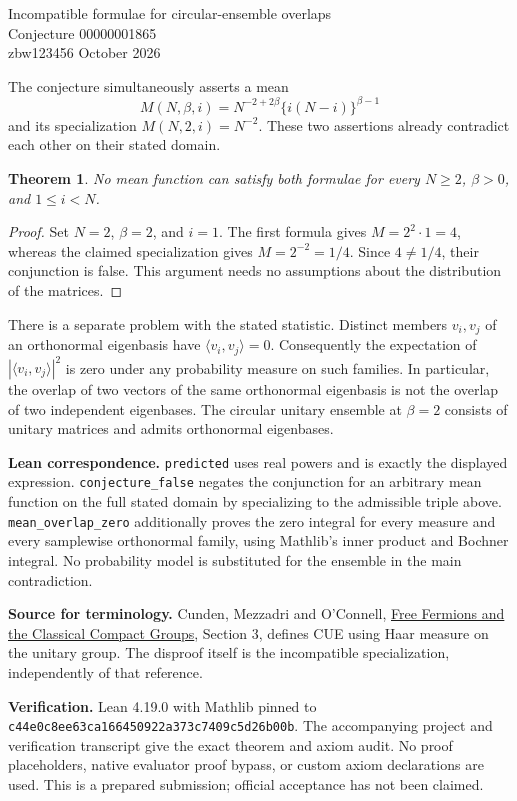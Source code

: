 \documentclass[11pt]{article}
\newtheorem{theorem}{Theorem}
\begin{document}
\begin{center}{\Large Incompatible formulae for circular-ensemble overlaps}\\[5pt]{\large Conjecture 00000001865}\\[5pt]zbw123456  October 2026\end{center}

The conjecture simultaneously asserts a mean
\[
 M(N,\beta,i)=N^{-2+2\beta}\{i(N-i)\}^{\beta-1}
\]
and its specialization $M(N,2,i)=N^{-2}$. These two assertions already contradict each other on their stated domain.
\begin{theorem}
No mean function can satisfy both formulae for every $N\ge2$, $\beta>0$, and $1\le i<N$.
\end{theorem}
\begin{proof}
Set $N=2$, $\beta=2$, and $i=1$. The first formula gives $M=2^2\cdot1=4$, whereas the claimed specialization gives $M=2^{-2}=1/4$. Since $4\ne1/4$, their conjunction is false. This argument needs no assumptions about the distribution of the matrices.
\end{proof}
There is a separate problem with the stated statistic. Distinct members $v_i,v_j$ of an orthonormal eigenbasis have $\langle v_i,v_j\rangle=0$. Consequently the expectation of $|\langle v_i,v_j\rangle|^2$ is zero under any probability measure on such families. In particular, the overlap of two vectors of the same orthonormal eigenbasis is not the overlap of two independent eigenbases. The circular unitary ensemble at $\beta=2$ consists of unitary matrices and admits orthonormal eigenbases.

\textbf{Lean correspondence.} \texttt{predicted} uses real powers and is exactly the displayed expression. \texttt{conjecture\_false} negates the conjunction for an arbitrary mean function on the full stated domain by specializing to the admissible triple above. \texttt{mean\_overlap\_zero} additionally proves the zero integral for every measure and every samplewise orthonormal family, using Mathlib's inner product and Bochner integral. No probability model is substituted for the ensemble in the main contradiction.

\textbf{Source for terminology.} Cunden, Mezzadri and O'Connell, \href{https://link.springer.com/article/10.1007/s10955-018-2029-6}{Free Fermions and the Classical Compact Groups}, Section 3, defines CUE using Haar measure on the unitary group. The disproof itself is the incompatible specialization, independently of that reference.


\textbf{Verification.} Lean 4.19.0 with Mathlib pinned to
\texttt{c44e0c8ee63ca166450922a373c7409c5d26b00b}.
The accompanying project and verification transcript give the exact theorem and axiom audit. No proof placeholders, native evaluator proof bypass, or custom axiom declarations are used. This is a prepared submission; official acceptance has not been claimed.
\end{document}
